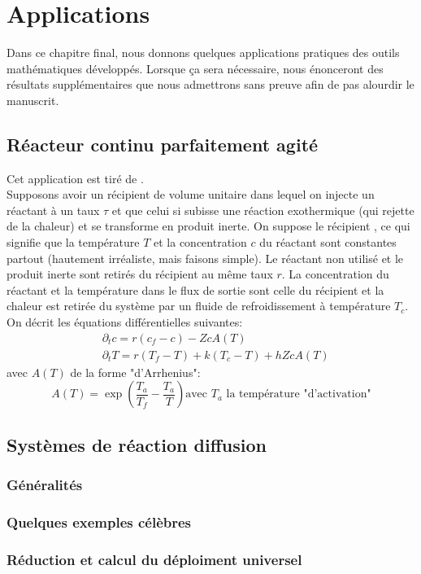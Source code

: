\documentclass[memoire.tex]{subfiles}
\begin{document}
\section{Applications}
Dans ce chapitre final, nous donnons quelques applications pratiques des outils mathématiques développés. Lorsque ça sera nécessaire, nous énonceront des résultats supplémentaires que nous admettrons sans preuve afin de pas alourdir le manuscrit.
\subsection{Réacteur continu parfaitement agité}
Cet application est tiré de \cite{golubitsky1985sgb1}.\\
Supposons avoir un récipient de volume unitaire dans lequel on injecte un réactant à un taux $\tau$ et que celui si subisse une réaction exothermique (qui rejette de la chaleur) et se transforme en produit inerte. On suppose le récipient , ce qui signifie que la température $T$ et la concentration $c$ du réactant sont constantes partout (hautement irréaliste, mais faisons simple). Le réactant non utilisé et le produit inerte sont retirés du récipient au même taux $r$. La concentration du réactant et la température dans le flux de sortie sont celle du récipient et la chaleur est retirée du système par un fluide de refroidissement à température $T_c$. On décrit les équations différentielles suivantes:
\begin{align*}
    &\partial_t c= r(c_f-c)-ZcA(T)\\
    &\partial_t T=r(T_f-T)+k(T_c-T)+hZcA(T)
\end{align*}
avec $A(T)$ de la forme "d'Arrhenius": 
\begin{equation*}
    A(T)=\exp\left( \frac{T_a}{T_f}-\frac{T_a}{T}\right)\text{avec $T_a$ la température "d'activation"}
\end{equation*}
\subsection{Systèmes de réaction diffusion}
\subsubsection*{Généralités}
\subsubsection*{Quelques exemples célèbres}
\subsubsection*{Réduction et calcul du déploiment universel}
\end{document}
